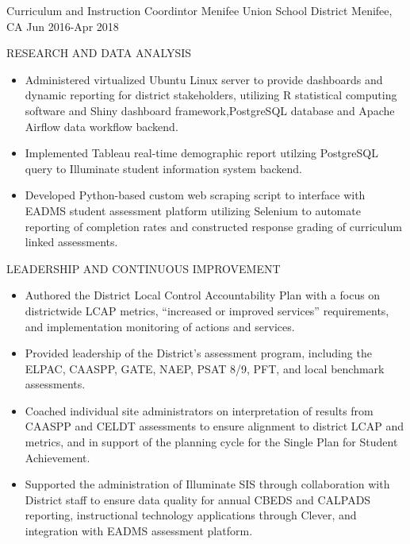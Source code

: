 \begin{cventries}
  \cventry
    {Curriculum and Instruction Coordintor} %
    {Menifee Union School District} %
    {Menifee, CA} %
    {Jun 2016-Apr 2018} %
    {
      \begin{cvitems} %
          \item RESEARCH AND DATA ANALYSIS
          \begin{itemize}
            \item {Administered virtualized Ubuntu Linux server to provide dashboards
            and dynamic reporting for district stakeholders, utilizing R statistical
            computing software and Shiny dashboard framework,PostgreSQL database and
            Apache Airflow data workflow backend.}
            \item {Implemented Tableau real-time demographic report utilzing PostgreSQL
            query to Illuminate student information system backend.}
            \item {Developed Python-based custom web scraping script to interface
            with EADMS student assessment platform utilizing Selenium to automate
            reporting of completion rates and constructed response grading of
            curriculum linked assessments.}
          \end{itemize}
          \item LEADERSHIP AND CONTINUOUS IMPROVEMENT
          \begin{itemize}
            \item {Authored the District Local Control Accountability Plan with a
            focus on districtwide LCAP metrics, “increased or improved services”
            requirements, and implementation monitoring of actions and services.}
            \item {Provided leadership of the District’s assessment program,
            including the ELPAC, CAASPP, GATE, NAEP, PSAT 8/9, PFT, and local
            benchmark assessments.}
            \item {Coached individual site administrators on interpretation of
            results from CAASPP and CELDT assessments to ensure alignment to district
            LCAP and metrics, and in support of the planning cycle for the Single
            Plan for Student Achievement.}
            \item {Supported the administration of Illuminate SIS through
            collaboration with District staff to ensure data quality for annual CBEDS
            and CALPADS reporting, instructional technology applications through
            Clever, and integration with EADMS assessment platform.}
          \end{itemize}
      \end{cvitems}
    }



\end{cventries}
